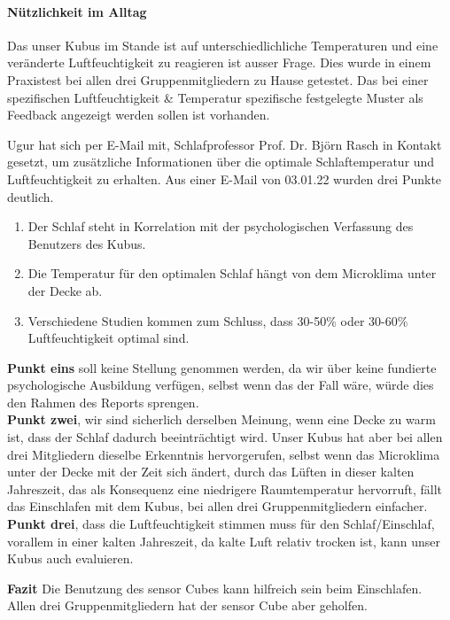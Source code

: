 \documentclass{article}
\begin{document}
\paragraph{Nützlichkeit im Alltag}
Das unser Kubus im Stande ist auf unterschiedlichliche Temperaturen und eine veränderte Luftfeuchtigkeit zu reagieren ist ausser Frage. Dies wurde in einem Praxistest bei allen drei Gruppenmitgliedern zu Hause getestet. Das bei einer spezifischen Luftfeuchtigkeit \& Temperatur spezifische festgelegte Muster als Feedback angezeigt werden sollen ist vorhanden. \newline \par Ugur hat sich per E-Mail mit, Schlafprofessor Prof. Dr. Björn Rasch in Kontakt gesetzt, um zusätzliche Informationen über die optimale Schlaftemperatur und Luftfeuchtigkeit zu erhalten. Aus einer E-Mail von 03.01.22 wurden drei Punkte deutlich. 
\begin{enumerate}
\item Der Schlaf steht in Korrelation mit der psychologischen Verfassung des Benutzers des Kubus.
\item Die Temperatur für den optimalen Schlaf hängt von dem Microklima unter der Decke ab.
\item Verschiedene Studien kommen zum Schluss, dass 30-50\% oder 30-60\% Luftfeuchtigkeit optimal sind.    
\end{enumerate}
\textbf{Punkt eins} soll keine Stellung genommen werden, da wir über keine fundierte psychologische Ausbildung verfügen, selbst wenn das der Fall wäre, würde dies den Rahmen des Reports sprengen. \\ \textbf{Punkt zwei}, wir sind sicherlich  derselben Meinung, wenn eine Decke zu warm ist, dass der Schlaf dadurch beeinträchtigt wird. Unser Kubus hat aber bei allen drei Mitgliedern dieselbe Erkenntnis hervorgerufen, selbst wenn das Microklima unter der Decke mit der Zeit sich ändert, durch das Lüften in dieser kalten Jahreszeit, das als Konsequenz eine niedrigere Raumtemperatur hervorruft, fällt das Einschlafen mit dem Kubus, bei allen drei Gruppenmitgliedern einfacher. \newline \textbf{Punkt drei}, dass die Luftfeuchtigkeit stimmen muss für den Schlaf/Einschlaf, vorallem in einer kalten Jahreszeit, da kalte Luft relativ trocken ist, kann unser Kubus auch evaluieren. \vspace*{0.2cm}
\par \textbf{Fazit} Die Benutzung des sensor Cubes kann hilfreich sein beim Einschlafen. Allen drei Gruppenmitgliedern hat der sensor Cube aber geholfen. 
 
\end{document}
